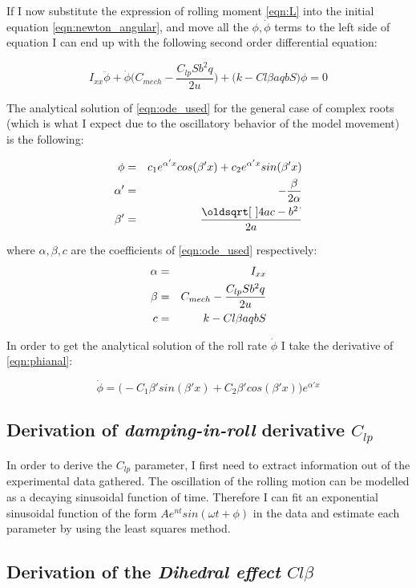If I now substitute the expression of rolling moment \ref{eqn:L} into the initial equation
\ref{eqn:newton_angular}, and move all the $\phi, \dot{\phi}$ terms to the left side of equation
I can end up with the following second order differential equation:

\begin{equation}
    I_{xx}\ddot{\phi} + \dot{\phi}\big(C_{mech} - \frac{C_{lp}Sb^2q}{2u}\big) + \big(k - C{l\beta}aqbS\big)\phi = 0
    \label{eqn:ode_used}
\end{equation}

The analytical solution of \ref{eqn:ode_used} for the general case of complex roots
(which is what I expect due to the oscillatory behavior of the model movement) is the following:

\begin{eqnarray}
    \phi &=&  c_1e^{\alpha' x}cos(\beta' x) + c_2e^{\alpha' x} sin(\beta' x) \label{eqn:phianal}\\
    \alpha' &=&  -\frac{\beta}{2\alpha} \notag\\
    \beta' &=&  \frac{\sqrt{4ac - b^2}}{2a} \notag\\
\end{eqnarray}

where $\alpha, \beta, c$ are the coefficients of \ref{eqn:ode_used} respectively:
\begin{eqnarray}
    \alpha &=& I_{xx} \notag\\
    \beta &=&  C_{mech} - \frac{C_{lp}Sb^2q}{2u} \notag\\
    c &=&  k - C{l\beta}aqbS \notag
\end{eqnarray}

\noindent In order to get the analytical solution of the roll rate $\dot{\phi}$ I take the derivative 
of \ref{eqn:phianal}:

\begin{equation}
    \dot{\phi} =  \big(-C_1 \beta' sin(\beta' x) + C_2 \beta' cos(\beta' x) \big) e^{\alpha' x}
    \label{eqn:panal}
\end{equation}

\subsection{Derivation of \textit{damping-in-roll} derivative $C_{lp}$}

In order to derive the $C_{lp}$ parameter, I first need to extract information out of 
the experimental data gathered. The oscillation of the rolling motion can be modelled as a 
decaying sinusoidal function of time. Therefore I can fit an exponential sinusoidal function 
of the form $Ae^{nt}sin(\omega t + \phi)$ in the data and estimate each parameter 
by using the least squares method.

\subsection{Derivation of the \textit{Dihedral effect} $C{l\beta}$}
